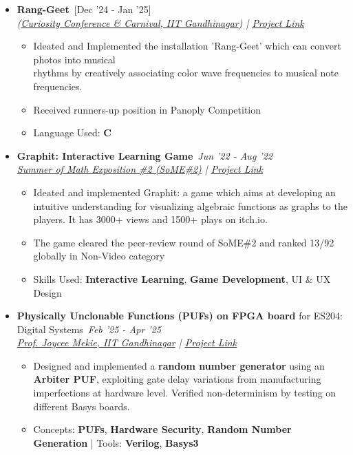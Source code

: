\documentclass[a4paper,10pt]{article}
\newcommand{\isep}{-2 pt}
\begin{document}
\begin{itemize}
    \item \textbf{Rang-Geet}\  \hfill [Dec '24 - Jan '25]\\
    \emph{{(\href{https://www.curiositylab.iitgn.ac.in/carnival}{Curiosity Conference \& Carnival, IIT Gandhinagar}) } |  \href{https://github.com/IdkRandomTry/Rang-Geet} {\underline{Project Link}}}\\[-0.7cm]
    \begin{itemize}\itemsep \isep
        \item Ideated and Implemented the installation 'Rang-Geet' which can convert photos into musical \\rhythms by creatively associating color wave frequencies to musical note frequencies.
        \item Received runners-up position in Panoply Competition 
        \item Language Used: \textbf{C}
    \end{itemize}

    \item \textbf{Graphit: Interactive Learning Game}\  \hfill \emph{Jun '22 - Aug '22}\\\emph{{\href{https://www.3blue1brown.com/topics/some}{Summer of Math Exposition \#2 (SoME\#2)} } |  \href{https://voxelrifts.itch.io/graphit} {\underline{Project Link}}}\\[-0.6cm]
    \begin{itemize}\itemsep \isep
        \item Ideated and implemented Graphit: a game which aims at developing an intuitive understanding for visualizing algebraic functions as graphs to the players. It has 3000+ views and 1500+ plays on itch.io.
        \item The game cleared the peer-review round of SoME\#2 and ranked 13/92 globally in Non-Video category
        \item Skills Used: \textbf{Interactive Learning}, \textbf{Game Development}, UI \& UX Design
    \end{itemize}


    
    \item \textbf{Physically Unclonable Functions (PUFs) on FPGA board} for ES204: Digital Systems\ \hfill \emph{Feb '25 - Apr '25} \\
    \emph{\href{https://iitgn.ac.in/faculty/ee/fac-joycee}{Prof. Joycee Mekie, IIT Gandhinagar} |  \href{https://github.com/IdkRandomTry/PUF} {\underline{Project Link}}}\\[-0.6cm]
    \begin{itemize}\itemsep \isep
        \item Designed and implemented a \textbf{random number generator} using an \textbf{Arbiter PUF}, exploiting gate delay variations from manufacturing imperfections at hardware level. Verified non-determinism by testing on different Basys boards. %
        \item Concepts: \textbf{PUFs}, \textbf{Hardware Security}, \textbf{Random Number Generation} | Tools: \textbf{Verilog}, \textbf{Basys3}
    \end{itemize}
    

\end{itemize}
\end{document}

